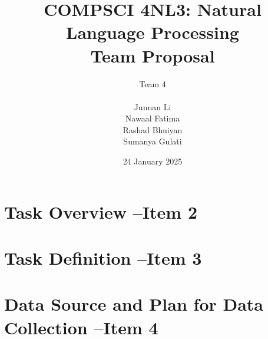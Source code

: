 \documentclass[titlepage]{article}
\title{COMPSCI 4NL3: Natural Language Processing\\Team Proposal}
\author{Team 4\\
  \\ Junnan Li
  \\ Nawaal Fatima
  \\ Rashad Bhuiyan
\\ Sumanya Gulati}
\date{24 January 2025}
\begin{document}
\begin{titlepage}
  \maketitle
\end{titlepage}

\newpage

\tableofcontents
\listoftables
\listoffigures

\newpage


\section{Task Overview --Item 2}

\section{Task Definition --Item 3}

\section{Data Source and Plan for Data Collection --Item 4}
\end{document}
